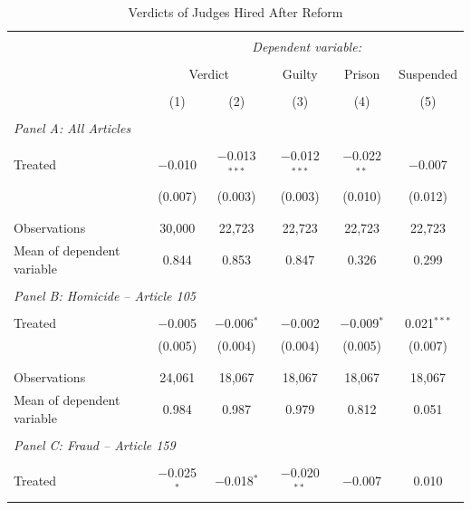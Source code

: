 \documentclass[12pt]{article}
\numberwithin{equation}{section}
\numberwithin{table}{section}
\numberwithin{figure}{section}
\begin{document}
\begin{table}[!htbp] \centering \footnotesize
    \begin{threeparttable}
    \caption{Verdicts of Judges Hired After Reform} 
    \label{tab:Result_1} 
  \begin{tabular}{@{\extracolsep{5pt}}lccccc} 
    \\[-1.8ex]\hline 
  \hline \\[-1.8ex] 
  & \multicolumn{5}{c}{\textit{Dependent variable:}}  \\ 
  \cline{2-6} 
  \\[-1.8ex] & \multicolumn{2}{c}{Verdict} & Guilty & Prison & Suspended \\ 
  \\[-1.8ex] & (1) & (2) & (3) & (4) & (5)\\ 
  \hline \\[-1.8ex] 
  \multicolumn{6}{l}{\textit{Panel A: All Articles}}\\[-1.8ex] \\
  Treated & $-$0.010 & $-$0.013$^{***}$ & $-$0.012$^{***}$ & $-$0.022$^{**}$ & $-$0.007 \\ 
  & (0.007) & (0.003) & (0.003) & (0.010) & (0.012) \\ 
    & & & & & \\[-1.8ex] 
 \hline\\[-1.8ex] 
  Observations & 30,000 & 22,723 & 22,723 & 22,723 & 22,723 \\ 
  Mean of dependent variable& 0.844 &0.853 &0.847 &0.326& 0.299\\
  \hline \\[-1.8ex] 
  \multicolumn{6}{l}{\textit{Panel B: Homicide -- Article 105}}\\[-1.8ex] \\
Treated  & $-$0.005 & $-$0.006$^{*}$ & $-$0.002 & $-$0.009$^{*}$ & 0.021$^{***}$ \\ 
& (0.005) & (0.004) & (0.004) & (0.005) & (0.007) \\ 
& & & & & \\[-1.8ex] 
\hline\\[-1.8ex] 
Observations & 24,061 & 18,067 & 18,067 & 18,067 & 18,067 \\
Mean of dependent variable&0.984 &0.987 &0.979 &0.812& 0.051\\ 
\hline \\[-1.8ex] 
\multicolumn{6}{l}{\textit{Panel C: Fraud -- Article 159}}\\[-1.8ex] \\
Treated & $-$0.025$^{*}$ & $-$0.018$^{*}$ & $-$0.020$^{**}$ & $-$0.007 & 0.010 \\ 

\end{tabular}
\end{threeparttable}
\end{table}
\end{document}
